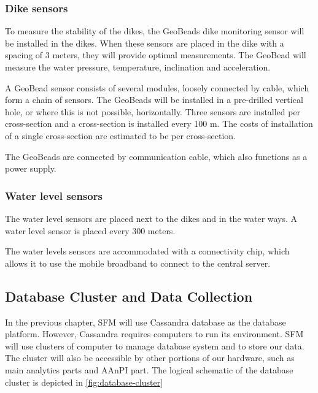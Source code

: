\subsubsection{Dike sensors}
To measure the stability of the dikes, the GeoBeads dike monitoring sensor will be installed in the dikes. When these sensors are placed in the dike with a spacing of 3 meters, they will provide optimal measurements\cite{ng180levee}. The GeoBead will measure the water pressure, temperature, inclination and acceleration.

A GeoBead sensor consists of several modules, loosely connected by cable, which form a chain of sensors. The GeoBeads will be installed in a pre-drilled vertical hole, or where this is not possible, horizontally. Three sensors are installed per cross-section and a cross-section is installed every 100 m. The costs of installation of a single cross-section are estimated to be  per cross-section\cite{TUDelftPHD}.%

The GeoBeads are connected by communication cable, which also functions as a power supply. 

\subsubsection{Water level sensors}
The water level sensors are placed next to the dikes and in the water ways. A water level sensor is placed every 300 meters. %

The water levels sensors are accommodated with a connectivity chip, which allows it to use the mobile broadband to connect to the central server.


\subsection{Database Cluster and Data Collection}
\label{subsec:database-data}
In the previous chapter, SFM will use Cassandra database as the database platform. However, Cassandra requires computers to run its environment. SFM will use clusters of computer to manage database system and to store our data. The cluster will also be accessible by other portions of our hardware, such as main analytics parts and AAnPI part. The logical schematic of the database cluster is depicted in \autoref{fig:database-cluster}

